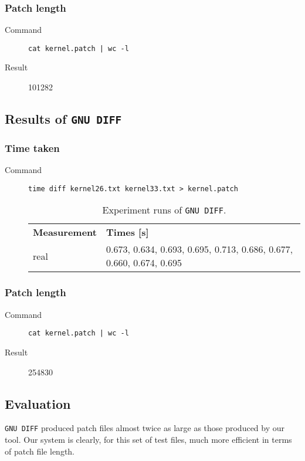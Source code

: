 \subsubsection*{Patch length}
\begin{description}
\item[Command] \texttt{cat kernel.patch | wc -l}
\item[Result] 101282
\end{description}
  
\subsection{Results of \texttt{GNU DIFF} }
\subsubsection*{Time taken}
\begin{description}
\item[Command] \texttt{time diff kernel26.txt kernel33.txt > kernel.patch}
\begin{table}[htbp]
\begin{center}
\begin{tabular}{ l p{3in} }
\textbf{Measurement} & \textbf{Times [s]} \\
\cmidrule(r){1-2}
real & 0.673, 0.634, 0.693, 0.695, 0.713, 0.686, 0.677, 0.660, 0.674, 0.695 \\
\end{tabular}
\end{center}
\caption{Experiment runs of \texttt{GNU DIFF}.}
\end{table}

\end{description}

\subsubsection*{Patch length}
\begin{description}
\item[Command] \texttt{cat kernel.patch | wc -l}
\item[Result] 254830
\end{description}

\subsection{Evaluation}
\texttt{GNU DIFF} produced patch files almost twice as large as those produced by our tool.
Our system is clearly, for this set of test files, much more efficient in terms of patch file length. 

